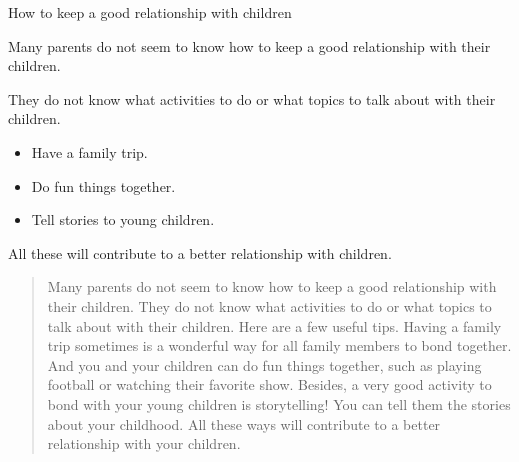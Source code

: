 \documentclass[11pt,a4paper]{article}
\begin{document}
\begin{paracol}{2}
\normalsize
\switchcolumn

\vspace{1em}



How to keep a good relationship with children


Many parents do not seem to know how to keep a good relationship with their children.


They do not know what activities to do or what topics to talk about with their children.


\begin{itemize}
    \item Have a family trip.
    \item Do fun things together.
    \item Tell stories to young children.
\end{itemize}


All these will contribute to a better relationship with children.

\begin{quote}
Many parents do not seem to know how to keep a good relationship with their children.
They do not know what activities to do or what topics to talk about with their children.
Here are a few useful tips.
Having a family trip sometimes is a wonderful way for all family members to bond together.
And you and your children can do fun things together, such as playing football or watching their favorite show.
Besides, a very good activity to bond with your young children is storytelling!
You can tell them the stories about your childhood.
All these ways will contribute to a better relationship with your children.
\end{quote}












\end{paracol}
\end{document}
